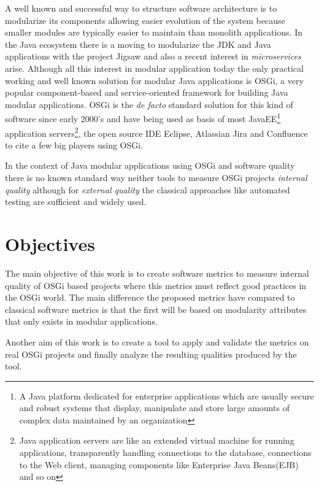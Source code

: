 A well known and successful way to structure software architecture is to modularize its components allowing easier evolution of the system because smaller modules are typically easier to maintain than monolith applications. In the Java ecosystem there is a moving to modularize the JDK and Java applications with the project Jigsaw \citep{Krill 2012} and also a recent interest in \emph{microservices} \citep{Knorr 2014} arise. Although all this interest in modular application today the only practical working and well known solution for modular Java applications is OSGi, a very popular component-based and service-oriented framework for building Java modular applications. OSGi is the \emph{de facto} standard solution for this kind of software since early 2000's and have being used as basis of most JavaEE\footnote{A Java platform dedicated for enterprise applications which are usually secure and robust systems that display, manipulate and store large amounts of complex data maintained by an organization} application servers\footnote{Java application servers are like an extended virtual machine for running applications, transparently handling connections to the database, connections to the Web client, managing components like Enterprise Java Beans(EJB) and so on}, the open source IDE Eclipse, Atlassian Jira and Confluence to cite a few big players using OSGi. 

In the context of Java modular applications using OSGi and software quality there is no known standard way neither tools to measure OSGi projects \textit{internal quality} \citep{Hamza 2013} although for \emph{external quality} the classical approaches like automated testing are sufficient and widely used.

        
\section{Objectives}
The main objective of this work is to create software metrics to measure internal quality of OSGi based projects where this metrics must reflect good practices in the OSGi world. The main difference the proposed metrics have compared to classical software metrics is that the first will be based on modularity attributes that only exists in modular applications.   

Another aim of this work is to create a tool to apply and validate the metrics on real OSGi projects and finally analyze the resulting qualities produced by the tool.  

